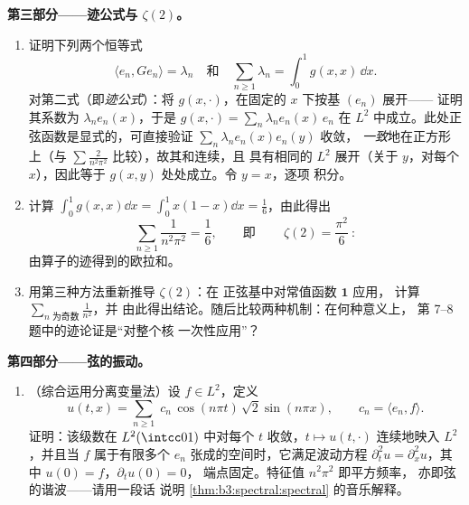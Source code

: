\begin{problem}
\medskip
\noindent\textbf{第三部分——迹公式与
$\zeta(2)$。}
\begin{enumerate}[resume]
  \item 证明下列两个恒等式
        \[
        \langle e_n, Ge_n\rangle = \lambda_n
        \quad\text{和}\quad
        \sum_{n\geq1}\lambda_n = \int_0^1 g(x,x)\,\dd x .
        \]
        对第二式（即\emph{迹公式}）：将
        $g(x, \cdot)$，在固定的 $x$ 下按基 $(e_n)$ 展开——
        证明其系数为 $\lambda_ne_n(x)$，于是
        $g(x, \cdot) = \sum_n\lambda_ne_n(x)\,e_n$ 在
        $L^2$ 中成立。此处正弦函数是显式的，可直接验证
        $\sum_n\lambda_ne_n(x)e_n(y)$ 收敛，
        \emph{一致}地在正方形上（与 $\sum
        \frac2{n^2\pi^2}$ 比较），故其和连续，且
        具有相同的 $L^2$ 展开（关于 $y$，对每个 $x$），因此等于
        $g(x,y)$ 处处成立。令 $y = x$，逐项
        积分。
  \item 计算 $\int_0^1g(x,x)\dd x = \int_0^1x(1-x)\dd x =
        \frac16$，由此得出
        \[
        \sum_{n\geq1}\frac{1}{n^2\pi^2} = \frac16,
        \qquad\text{即}\qquad
        \boxed{\ \zeta(2) = \frac{\pi^2}{6}\ } :
        \]
        由算子的迹得到的欧拉和。
  \item 用第三种方法重新推导 $\zeta(2)$：在
        正弦基中对常值函数 $\mathbf 1$ 应用，
        计算 $\sum_{n \text{ 为奇数}}\frac1{n^2}$，并
        由此得出结论。随后比较两种机制：在何种意义上，
        第 7--8 题中的迹论证是“对整个核
        一次性应用”？
\end{enumerate}

\medskip
\noindent\textbf{第四部分——弦的振动。}
\begin{enumerate}[resume]
  \item （综合运用分离变量法）设 $f \in
        L^2$，定义
        \[
        u(t, x) = \sum_{n\geq1}\;c_n\,
        \cos(n\pi t)\,\sqrt2\sin(n\pi x),
        \qquad c_n = \langle e_n, f\rangle .
        \]
        证明：该级数在 $L^2(\intcc01)$ 中对每个
        $t$ 收敛，$t\mapsto u(t, \cdot)$ 连续地映入
        $L^2$，并且当 $f$ 属于有限多个
        $e_n$ 张成的空间时，它满足波动方程 $\partial_t^2u =
        \partial_x^2u$，其中 $u(0) = f$，$\partial_tu(0) = 0$，
        端点固定。特征值 $n^2\pi^2$ 即平方频率，
        亦即弦的谐波——请用一段话
        说明
        \cref{thm:b3:spectral:spectral} 的音乐解释。
\end{enumerate}


\end{problem}
